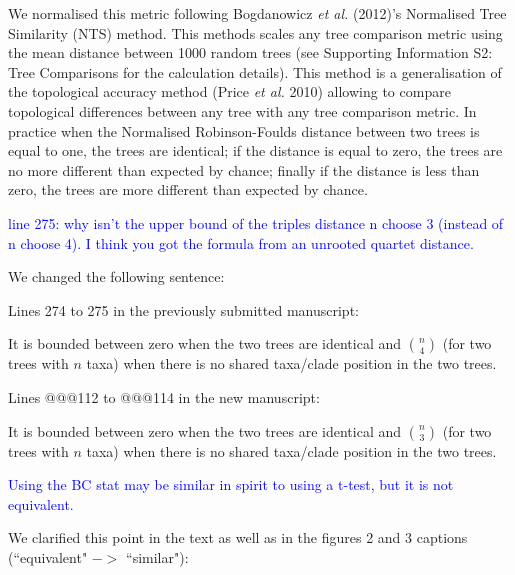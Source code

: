 \documentclass[11pt]{letter}
\begin{document}
\begin{letter}{}
\hfill\begin{minipage}{\dimexpr\textwidth-1cm}
We normalised this metric following Bogdanowicz \textit{et al.} (2012)'s Normalised Tree Similarity (NTS) method. This methods scales %
any tree comparison metric using the mean distance between 1000 random trees (see Supporting Information S2: Tree Comparisons for the calculation details). This method is a generalisation of the topological accuracy method (Price \textit{et al.} 2010) allowing to compare topological differences between any tree with any tree comparison metric. In practice when the Normalised Robinson-Foulds distance between two trees is equal to one, the trees are identical; if the distance is equal to zero, the trees are no more different than expected by chance; finally if the distance is less than zero, the trees are more different than expected by chance.
\end{minipage}


\textcolor{blue}{line 275: why isn't the upper bound of the triples distance n choose 3 (instead of n choose 4). I think you got the formula from an unrooted quartet distance.}

We changed the following sentence:

Lines 274 to 275 in the previously submitted manuscript:

\hfill\begin{minipage}{\dimexpr\textwidth-1cm}
It is bounded between zero when the two trees are identical and $\binom{n}{4}$ (for two trees with $n$ taxa) when there is no shared taxa/clade position in the two trees.
\end{minipage}

Lines @@@112 to @@@114 in the new manuscript:

\hfill\begin{minipage}{\dimexpr\textwidth-1cm}
It is bounded between zero when the two trees are identical and $\binom{n}{3}$ (for two trees with $n$ taxa) when there is no shared taxa/clade position in the two trees.
\end{minipage}



\textcolor{blue}{Using the BC stat may be similar in spirit to using a t-test, but it is not equivalent.}

We clarified this point in the text as well as in the figures 2 and 3 captions (``equivalent" $->$ ``similar"):


\end{letter}
\end{document}

